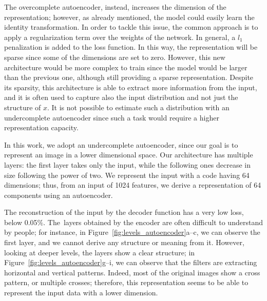 The overcomplete autoencoder, instead, increases the dimension of the representation; however, as already mentioned, the model could easily learn the identity transformation. In order to tackle this issue, the common approach is to apply a regularization term over the weights of the network. In general, a $l_1$ penalization is added to the loss function.
In this way, the representation will be sparse since some of the dimensions are set to zero.
However, this new architecture would be more complex to train since the model would be larger than the previous one, although still providing a sparse representation.
Despite its sparsity, this architecture is able to extract more information from the input, and it is often used to capture also the input distribution and not just the structure of $x$. It is not possible to estimate such a distribution with an undercomplete autoencoder since such a task would require a higher representation capacity.

In this work, we adopt an undercomplete autoencoder, since our goal is to represent an image in a lower dimensional space. 
Our architecture has multiple layers: the first layer takes only the input, while the following ones decrease in size following the power of two.
We represent the input with a code having 64 dimensions; thus, from an input of 1024 features, we derive a representation of 64 components using an autoencoder.

The reconstruction of the input by the decoder function has a very low loss, below 0.05$\%$. The~layers obtained by the encoder are often difficult to understand by people; for instance, in Figure~\ref{fig:levels_autoencoder}a--c, we can observe the first layer, and we cannot derive any structure or meaning from it.
However, looking at deeper levels, the layers show a clear structure; in Figure~\ref{fig:levels_autoencoder}g--i, we can observe that the filters are extracting horizontal and vertical patterns. Indeed, most of the original images show a cross pattern, or multiple crosses; therefore, this representation seems to be able to represent the input data with a lower dimension.

